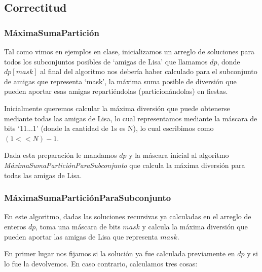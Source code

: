 \subsection{Correctitud}

\subsubsection{MáximaSumaPartición}
Tal como vimos en ejemplos en clase, inicializamos un arreglo de soluciones para
todos los subconjuntos posibles de `amigas de Lisa' que llamamos $dp$, donde
$dp[mask]$ al final del algoritmo nos debería haber calculado para el
subconjunto de amigas que representa `mask', la máxima suma posible de diversión
que pueden aportar esas amigas repartiéndolas (particionándolas) en fiestas.

Inicialmente queremos calcular la máxima diversión que puede obtenerse mediante
todas las amigas de Lisa, lo cual representamos mediante la máscara de bits
`11...1' (donde la cantidad de 1s es N), lo cual escribimos como $(1<<N)-1$.

Dada esta preparación le mandamos $dp$ y la máscara inicial al algoritmo
\emph{MáximaSumaParticiónParaSubconjunto} que calcula la máxima diversión para todas
las amigas de Lisa.

\subsubsection{MáximaSumaParticiónParaSubconjunto}

En este algoritmo, dadas las soluciones recursivas ya calculadas en el arreglo
de enteros $dp$, toma una máscara de bits $mask$ y calcula la máxima diversión
que pueden aportar las amigas de Lisa que representa $mask$.

En primer lugar nos fijamos si la solución ya fue calculada previamente en $dp$
y si lo fue la devolvemos. En caso contrario, calculamos tres cosas:

